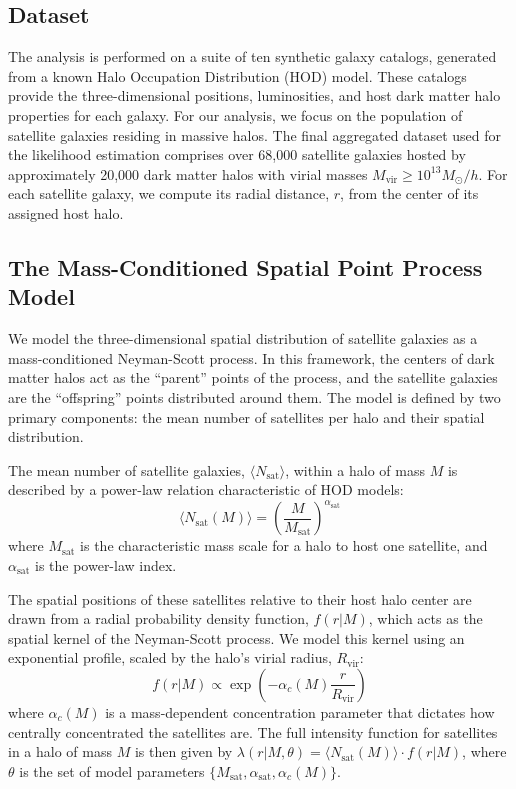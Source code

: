 \documentclass[]{article}
\begin{document}
\subsection{Dataset}
The analysis is performed on a suite of ten synthetic galaxy catalogs, generated from a known Halo Occupation Distribution (HOD) model. These catalogs provide the three-dimensional positions, luminosities, and host dark matter halo properties for each galaxy. For our analysis, we focus on the population of satellite galaxies residing in massive halos. The final aggregated dataset used for the likelihood estimation comprises over 68,000 satellite galaxies hosted by approximately 20,000 dark matter halos with virial masses $M_{\text{vir}} \ge 10^{13} M_\odot/h$. For each satellite galaxy, we compute its radial distance, $r$, from the center of its assigned host halo.

\subsection{The Mass-Conditioned Spatial Point Process Model}
We model the three-dimensional spatial distribution of satellite galaxies as a mass-conditioned Neyman-Scott process. In this framework, the centers of dark matter halos act as the ``parent'' points of the process, and the satellite galaxies are the ``offspring'' points distributed around them. The model is defined by two primary components: the mean number of satellites per halo and their spatial distribution.

The mean number of satellite galaxies, $\langle N_{\text{sat}} \rangle$, within a halo of mass $M$ is described by a power-law relation characteristic of HOD models:
\begin{equation}
\langle N_{\text{sat}}(M) \rangle = \left( \frac{M}{M_{\text{sat}}} \right)^{\alpha_{\text{sat}}}
\end{equation}
where $M_{\text{sat}}$ is the characteristic mass scale for a halo to host one satellite, and $\alpha_{\text{sat}}$ is the power-law index.

The spatial positions of these satellites relative to their host halo center are drawn from a radial probability density function, $f(r|M)$, which acts as the spatial kernel of the Neyman-Scott process. We model this kernel using an exponential profile, scaled by the halo's virial radius, $R_{\text{vir}}$:
\begin{equation}
f(r|M) \propto \exp\left(-\alpha_c(M) \frac{r}{R_{\text{vir}}}\right)
\end{equation}
where $\alpha_c(M)$ is a mass-dependent concentration parameter that dictates how centrally concentrated the satellites are. The full intensity function for satellites in a halo of mass $M$ is then given by $\lambda(r | M, \theta) = \langle N_{\text{sat}}(M) \rangle \cdot f(r|M)$, where $\theta$ is the set of model parameters $\{M_{\text{sat}}, \alpha_{\text{sat}}, \alpha_c(M)\}$.
\end{document}
